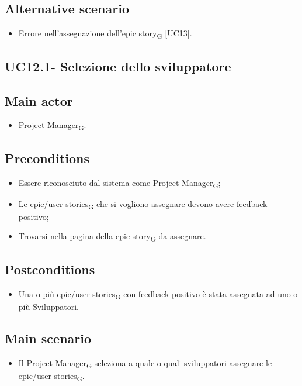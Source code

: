 \documentclass{article}
\begin{document}
    \subsection*{Alternative scenario}
        \begin{itemize}
            \item Errore nell'assegnazione dell'epic story\textsubscript{G} [UC13].
        \end{itemize}    
        
    \subsection{UC12.1- Selezione dello sviluppatore}
        \subsection*{Main actor}
    \begin{itemize}
        \item Project Manager\textsubscript{G}.
    \end{itemize}
    
    \subsection*{Preconditions}
        \begin{itemize}
            \item Essere riconosciuto dal sistema come Project Manager\textsubscript{G};
            \item Le epic/user stories\textsubscript{G} che si vogliono assegnare devono avere feedback positivo;
            \item Trovarsi nella pagina della epic story\textsubscript{G} da assegnare.
        \end{itemize}
        
    \subsection*{Postconditions}
        \begin{itemize}
            \item Una o più epic/user stories\textsubscript{G} con feedback positivo è stata assegnata ad uno o più Sviluppatori.
        \end{itemize}

    \subsection*{Main scenario}
    \begin{itemize}
        \item Il Project Manager\textsubscript{G} seleziona a quale o quali sviluppatori assegnare le epic/user stories\textsubscript{G}.
    \end{itemize}
\end{document}

